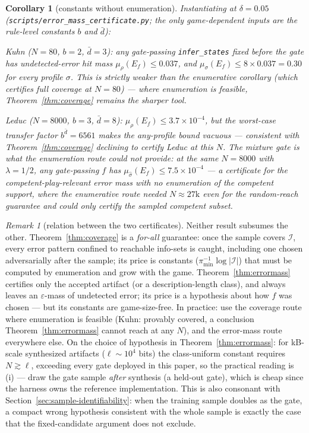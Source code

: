 \documentclass[11pt]{article}
\newtheorem{corollary}{Corollary}
\theoremstyle{remark}
\newtheorem{remark}{Remark}
\newcommand{\Ireach}{\mathcal{I}}
\begin{document}
\begin{corollary}[constants without enumeration]
Instantiating at $\delta = 0.05$ (\texttt{scripts/\allowbreak error\_\allowbreak mass\_\allowbreak certificate.py}; the only game-dependent inputs are the rule-level constants $b$ and $\bar d$):

\emph{Kuhn} ($N = 80$, $b = 2$, $\bar d = 3$): any gate-passing \texttt{infer\_states} fixed before the gate has undetected-error hit mass $\mu_\rho(E_f) \leq 0.037$, and $\mu_\sigma(E_f) \leq 8 \times 0.037 = 0.30$ for every profile $\sigma$. This is strictly weaker than the enumerative corollary (which certifies \emph{full coverage} at $N = 80$) --- where enumeration is feasible, Theorem~\ref{thm:coverage} remains the sharper tool.

\emph{Leduc} ($N = 8000$, $b = 3$, $\bar d = 8$): $\mu_\rho(E_f) \leq 3.7 \times 10^{-4}$, but the worst-case transfer factor $b^{\bar d} = 6561$ makes the any-profile bound vacuous --- consistent with Theorem~\ref{thm:coverage} declining to certify Leduc at this $N$. The mixture gate is what the enumeration route could not provide: at the same $N = 8000$ with $\lambda = 1/2$, any gate-passing $f$ has $\mu_{\hat\sigma}(E_f) \leq 7.5 \times 10^{-4}$ --- a certificate for the competent-play-relevant error mass with \emph{no} enumeration of the competent support, where the enumerative route needed $N \approx 27\text{k}$ even for the random-reach guarantee and could only certify the \emph{sampled} competent subset.
\end{corollary}

\begin{remark}[relation between the two certificates]
\label{rem:tworoutes}
Neither result subsumes the other. Theorem~\ref{thm:coverage} is a \emph{for-all} guarantee: once the sample covers $\Ireach$, every error pattern confined to reachable info-sets is caught, including one chosen adversarially after the sample; its price is constants ($\pi_{\min}^{-1} \log |\Ireach|$) that must be computed by enumeration and grow with the game. Theorem~\ref{thm:errormass} certifies only the accepted artifact (or a description-length class), and always leaves an $\varepsilon$-mass of undetected error; its price is a hypothesis about how $f$ was chosen --- but its constants are game-size-free. In practice: use the coverage route where enumeration is feasible (Kuhn: provably covered, a conclusion Theorem~\ref{thm:errormass} cannot reach at any $N$), and the error-mass route everywhere else. On the choice of hypothesis in Theorem~\ref{thm:errormass}: for kB-scale synthesized artifacts ($\ell \sim 10^4$ bits) the class-uniform constant requires $N \gtrsim \ell$, exceeding every gate deployed in this paper, so the practical reading is (i) --- draw the gate sample \emph{after} synthesis (a held-out gate), which is cheap since the harness owns the reference implementation. This is also consonant with Section~\ref{sec:sample-identifiability}: when the training sample doubles as the gate, a compact wrong hypothesis consistent with the whole sample is exactly the case that the fixed-candidate argument does not exclude.
\end{remark}
\end{document}
